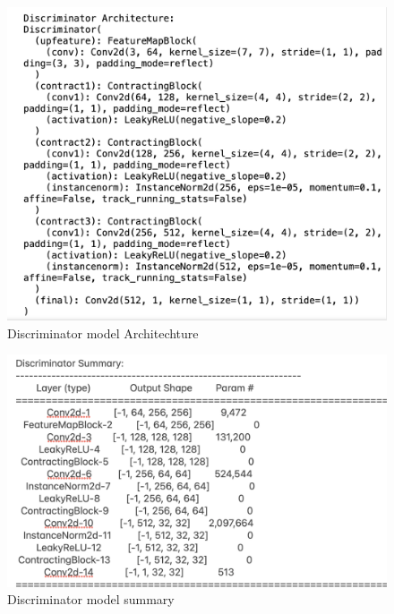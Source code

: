 \documentclass[UKenglish,12pt]{master-style}
\begin{document}
\begin{figure}[htbp]
    \centering
    \includegraphics[width=1\textwidth]{Images/Discriminator_Architechture.png}
    \caption{Discriminator model Architechture}
    \label{fig:Discriminator_Architechture}
\end{figure}

\begin{figure}[htbp]
    \centering
    \includegraphics[width=1\textwidth]{Images/D_model_summary.png}
    \caption{Discriminator model summary}
    \label{fig:D_model_summary}
\end{figure}
\end{document}
